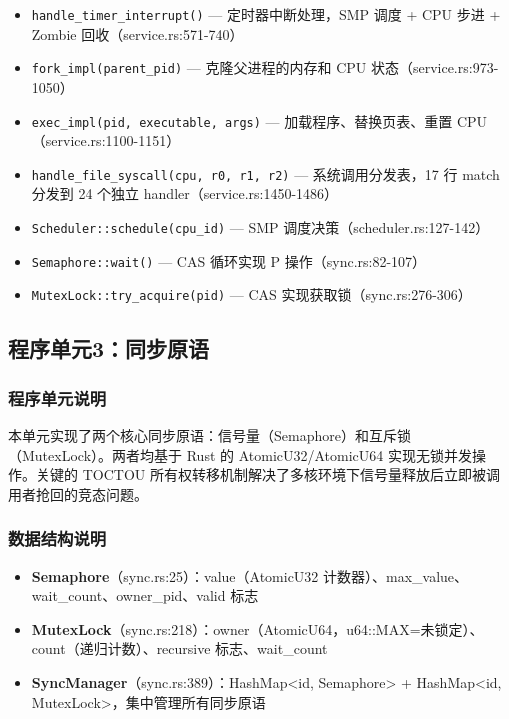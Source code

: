 \documentclass[UTF8,a4paper,12pt]{ctexart}
\begin{document}
\begin{itemize}
    \item \texttt{handle\_timer\_interrupt()} — 定时器中断处理，SMP 调度 + CPU 步进 + Zombie 回收（service.rs:571-740）
    \item \texttt{fork\_impl(parent\_pid)} — 克隆父进程的内存和 CPU 状态（service.rs:973-1050）
    \item \texttt{exec\_impl(pid, executable, args)} — 加载程序、替换页表、重置 CPU（service.rs:1100-1151）
    \item \texttt{handle\_file\_syscall(cpu, r0, r1, r2)} — 系统调用分发表，17 行 match 分发到 24 个独立 handler（service.rs:1450-1486）
    \item \texttt{Scheduler::schedule(cpu\_id)} — SMP 调度决策（scheduler.rs:127-142）
    \item \texttt{Semaphore::wait()} — CAS 循环实现 P 操作（sync.rs:82-107）
    \item \texttt{MutexLock::try\_acquire(pid)} — CAS 实现获取锁（sync.rs:276-306）
\end{itemize}

\subsection{程序单元3：同步原语}

\subsubsection{程序单元说明}

本单元实现了两个核心同步原语：信号量（Semaphore）和互斥锁（MutexLock）。两者均基于 Rust 的 AtomicU32/AtomicU64 实现无锁并发操作。关键的 TOCTOU 所有权转移机制解决了多核环境下信号量释放后立即被调用者抢回的竞态问题。

\subsubsection{数据结构说明}

\begin{itemize}
    \item \textbf{Semaphore}（sync.rs:25）：value（AtomicU32 计数器）、max\_value、wait\_count、owner\_pid、valid 标志
    \item \textbf{MutexLock}（sync.rs:218）：owner（AtomicU64，u64::MAX=未锁定）、count（递归计数）、recursive 标志、wait\_count
    \item \textbf{SyncManager}（sync.rs:389）：HashMap<id, Semaphore> + HashMap<id, MutexLock>，集中管理所有同步原语
\end{itemize}
\end{document}
